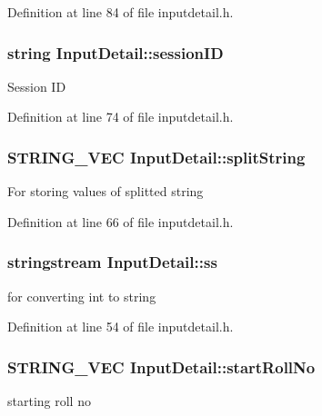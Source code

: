 Definition at line 84 of file inputdetail.\-h.

\hypertarget{classInputDetail_a1f276e4df260009d465032ec64f3a543}{
\subsubsection[{session\-I\-D}]{\setlength{\rightskip}{0pt plus 5cm}string Input\-Detail\-::session\-I\-D\hspace{0.3cm}{\ttfamily [protected]}}}\label{classInputDetail_a1f276e4df260009d465032ec64f3a543}
Session I\-D 

Definition at line 74 of file inputdetail.\-h.

\hypertarget{classInputDetail_ab09ed4176090a72237531cedf00afb41}{
\subsubsection[{split\-String}]{\setlength{\rightskip}{0pt plus 5cm}S\-T\-R\-I\-N\-G\-\_\-\-V\-E\-C Input\-Detail\-::split\-String\hspace{0.3cm}{\ttfamily [protected]}}}\label{classInputDetail_ab09ed4176090a72237531cedf00afb41}
For storing values of splitted string 

Definition at line 66 of file inputdetail.\-h.

\hypertarget{classInputDetail_a5284736b5fd3db0251cfeab7c581c0bd}{
\subsubsection[{ss}]{\setlength{\rightskip}{0pt plus 5cm}stringstream Input\-Detail\-::ss\hspace{0.3cm}{\ttfamily [protected]}}}\label{classInputDetail_a5284736b5fd3db0251cfeab7c581c0bd}
for converting int to string 

Definition at line 54 of file inputdetail.\-h.

\hypertarget{classInputDetail_a7262436753ac62bf068cc23b97049f61}{
\subsubsection[{start\-Roll\-No}]{\setlength{\rightskip}{0pt plus 5cm}S\-T\-R\-I\-N\-G\-\_\-\-V\-E\-C Input\-Detail\-::start\-Roll\-No\hspace{0.3cm}{\ttfamily [protected]}}}\label{classInputDetail_a7262436753ac62bf068cc23b97049f61}
starting roll no 

